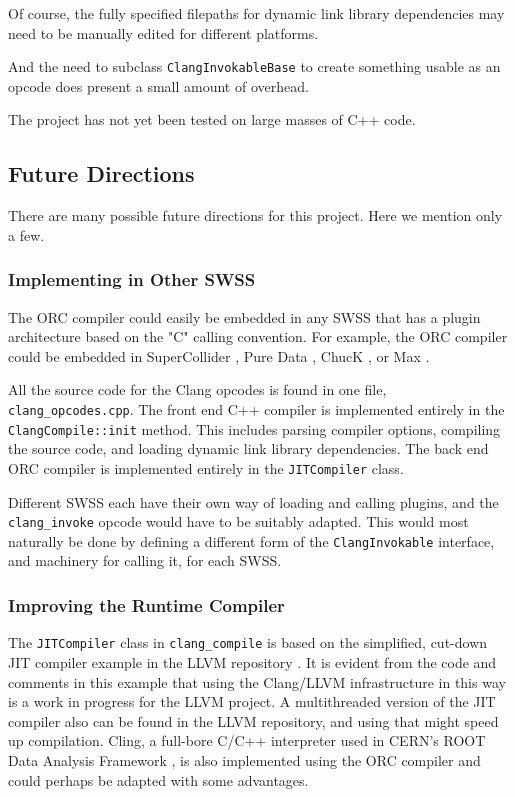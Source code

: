 \documentclass[letterpaper, 12pt]{article}
\begin{document}
Of course, the fully specified filepaths for dynamic link library dependencies may need to be manually edited for different platforms.

And the need to subclass \verb|ClangInvokableBase| to create something usable as an opcode does present a small amount of overhead.

The project has not yet been tested on large masses of C++ code.

\subsection{Future Directions}

There are many possible future directions for this project. Here we mention only a few.

\subsubsection{Implementing in Other SWSS}

The ORC compiler could easily be embedded in any SWSS that has a plugin architecture based on the "C" calling convention. For example, the ORC compiler could be embedded in SuperCollider \citep{supercollider}, Pure Data \citep{pd}, ChucK \citep{chuck, chuckcmj}, or Max \citep{max}. 

All the source code for the Clang opcodes is found in one file, \verb|clang_opcodes.cpp|. The front end C++ compiler is implemented entirely in the \verb|ClangCompile::init| method. This includes parsing compiler options, compiling the source code, and loading dynamic link library dependencies. The back end ORC compiler is implemented entirely in the \verb|JITCompiler| class. 

Different SWSS each have their own way of loading and calling plugins, and the \verb|clang_invoke| opcode would have to be suitably adapted. This would most naturally be done by defining a different form of the \verb|ClangInvokable| interface, and machinery for calling it, for each SWSS.

\subsubsection{Improving the Runtime Compiler}

The \verb|JITCompiler| class in \verb|clang_compile| is based on the simplified, cut-down JIT compiler example in the LLVM repository \citep{clanginterpreter}. It is evident from the code and comments in this example that using the Clang/LLVM infrastructure in this way is a work in progress for the LLVM project. A multithreaded version of the JIT compiler also can be found in the LLVM repository, and using that might speed up compilation. Cling, a full-bore C/C++ interpreter \citep{vasilev2012cling, clingrepo} used in CERN's ROOT Data Analysis Framework \citep{ROOT}, is also implemented using the ORC compiler and could perhaps be adapted with some advantages.
\end{document}
